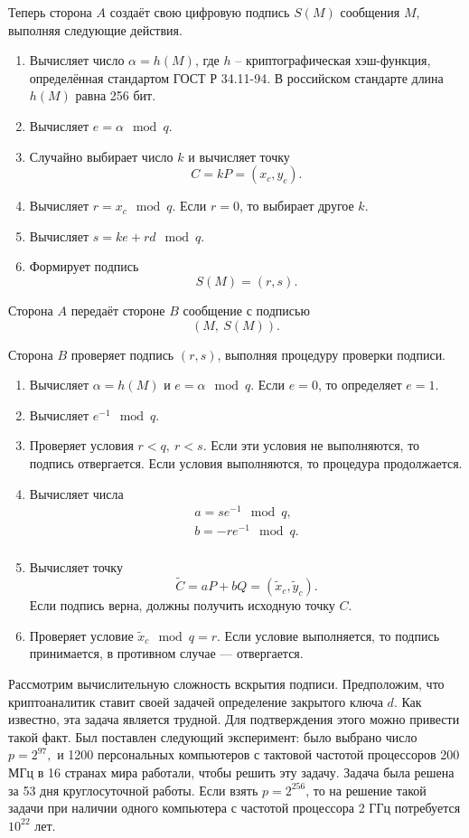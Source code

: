 Теперь сторона $A$ создаёт свою цифровую подпись $S(M)$ сообщения $M$, выполняя следующие действия.
\begin{enumerate}
    \item Вычисляет число $\alpha = h(M)$, где $h$ -- криптографическая хэш-функция, определённая стандартом ГОСТ Р 34.11-94. В российском стандарте длина $h(M)$ равна 256 бит.
    \item Вычисляет  $e = \alpha \mod q$.
    \item Случайно выбирает число $k$ и вычисляет точку
        \[ C = k P = (x_c, y_c). \]
    \item Вычисляет  $r = x_c \mod q$.
	Если $r = 0$, то выбирает другое $k$.
    \item Вычисляет  $s = k e + r d \mod q$.
    \item Формирует подпись
        \[ S(M) = (r, s). \]
\end{enumerate}
Сторона $A$ передаёт стороне $B$ сообщение с подписью
    \[ (M, ~ S(M)). \]

Сторона $B$ проверяет подпись $(r,s)$, выполняя процедуру проверки подписи.
\begin{enumerate}
    \item Вычисляет  $\alpha = h(M)$ и $e = \alpha \mod q$. Если $e = 0$, то определяет $e = 1$.
    \item Вычисляет  $e^{-1} \mod q$.
    \item Проверяет условия $r < q, ~ r < s$. Если эти условия не выполняются, то подпись отвергается. Если условия выполняются, то процедура продолжается.
    \item Вычисляет числа
        \[ \begin{array}{l}
            a = s e^{-1} \mod q, \\
            b = -r e^{-1} \mod q. \\
        \end{array} \]
    \item Вычисляет точку
        \[ \tilde{C} = a P + b Q = (\tilde{x}_c, \tilde{y}_c). \]
        Если подпись верна, должны получить исходную точку $C$.
    \item Проверяет условие $\tilde{x}_{c} \mod q = r$. Если условие выполняется, то подпись принимается, в противном случае --- отвергается.
\end{enumerate}

Рассмотрим вычислительную сложность вскрытия подписи. Предположим, что криптоаналитик ставит своей задачей определение закрытого ключа $d$. Как известно, эта задача является трудной. Для подтверждения этого можно привести такой факт. Был поставлен следующий эксперимент: было выбрано число $p = 2^{97},$ и 1200 персональных компьютеров с тактовой частотой процессоров 200 МГц в 16 странах мира работали, чтобы решить эту задачу. Задача была решена за 53 дня круглосуточной работы. Если взять $p = 2^{256}$, то на решение такой задачи при наличии одного компьютера с частотой процессора 2 ГГц потребуется $10^{22}$ лет.
